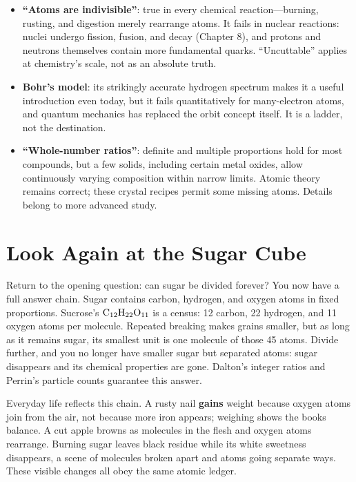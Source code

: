 \begin{itemize}[itemsep=2pt]
\item \textbf{``Atoms are indivisible''}: true in every chemical reaction---burning, rusting, and digestion merely rearrange atoms. It fails in nuclear reactions: nuclei undergo fission, fusion, and decay (Chapter 8), and protons and neutrons themselves contain more fundamental quarks. ``Uncuttable'' applies at chemistry's scale, not as an absolute truth.
\item \textbf{Bohr's model}: its strikingly accurate hydrogen spectrum makes it a useful introduction even today, but it fails quantitatively for many-electron atoms, and quantum mechanics has replaced the orbit concept itself. It is a ladder, not the destination.
\item \textbf{``Whole-number ratios''}: definite and multiple proportions hold for most compounds, but a few solids, including certain metal oxides, allow continuously varying composition within narrow limits. Atomic theory remains correct; these crystal recipes permit some missing atoms. Details belong to more advanced study.
\end{itemize}

\section{Look Again at the Sugar Cube}

Return to the opening question: can sugar be divided forever? You now have a full answer chain. Sugar contains carbon, hydrogen, and oxygen atoms in fixed proportions. Sucrose's $\mathrm{C_{12}H_{22}O_{11}}$ is a census: 12 carbon, 22 hydrogen, and 11 oxygen atoms per molecule. Repeated breaking makes grains smaller, but as long as it remains sugar, its smallest unit is one molecule of those 45 atoms. Divide further, and you no longer have smaller sugar but separated atoms: sugar disappears and its chemical properties are gone. Dalton's integer ratios and Perrin's particle counts guarantee this answer.

Everyday life reflects this chain. A rusty nail \textbf{gains} weight because oxygen atoms join from the air, not because more iron appears; weighing shows the books balance. A cut apple browns as molecules in the flesh and oxygen atoms rearrange. Burning sugar leaves black residue while its white sweetness disappears, a scene of molecules broken apart and atoms going separate ways. These visible changes all obey the same atomic ledger.

